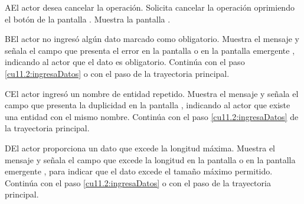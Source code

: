  \begin{UCtrayectoriaA}{A}{El actor desea cancelar la operación.}
    \UCpaso[\UCactor] Solicita cancelar la operación oprimiendo el botón  de la pantalla .
    \UCpaso[\UCsist] Muestra la pantalla .
 \end{UCtrayectoriaA}
 \begin{UCtrayectoriaA}{B}{El actor no ingresó algún dato marcado como obligatorio.}
    \UCpaso[\UCsist] Muestra el mensaje  y señala el campo que presenta el error en la pantalla 
	     o en la pantalla emergente , indicando al actor que el dato es obligatorio.
    \UCpaso[] Continúa con el paso \ref{cu11.2:ingresaDatos} o con el paso \label{cu11.2:ingresaComentario} de la trayectoria principal.
 \end{UCtrayectoriaA}
 \begin{UCtrayectoriaA}{C}{El actor ingresó un nombre de entidad repetido.}
    \UCpaso[\UCsist] Muestra el mensaje  y señala el campo que presenta la duplicidad en la pantalla 
	    , indicando al actor que existe una entidad con el mismo nombre.
    \UCpaso[] Continúa con el paso \ref{cu11.2:ingresaDatos} de la trayectoria principal.
 \end{UCtrayectoriaA}
 \begin{UCtrayectoriaA}{D}{El actor proporciona un dato que excede la longitud máxima.}
    \UCpaso[\UCsist] Muestra el mensaje  y señala el campo que excede la 
    longitud en la pantalla  o en la pantalla emergente , para indicar que el dato excede el tamaño máximo permitido.
    \UCpaso[] Continúa con el paso \ref{cu11.2:ingresaDatos} o con el paso \label{cu11.2:ingresaComentario} de la trayectoria principal.
 \end{UCtrayectoriaA}
